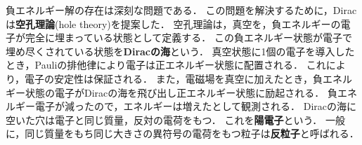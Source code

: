 \documentclass{report}
\begin{document}
    負エネルギー解の存在は深刻な問題である．
    この問題を解決するために，Diracは\textbf{空孔理論}(hole theory)を提案した．
    空孔理論は，真空を，負エネルギーの電子が完全に埋まっている状態として定義する．
    この負エネルギー状態が電子で埋め尽くされている状態を\textbf{Diracの海}という．
    真空状態に1個の電子を導入したとき，Pauliの排他律により電子は正エネルギー状態に配置される．
    これにより，電子の安定性は保証される．
    また，電磁場を真空に加えたとき，負エネルギー状態の電子がDiracの海を飛び出し正エネルギー状態に励起される．
    負エネルギー電子が減ったので，エネルギーは増えたとして観測される．
    Diracの海に空いた穴は電子と同じ質量，反対の電荷をもつ．
    これを\textbf{陽電子}という．
    一般に，同じ質量をもち同じ大きさの異符号の電荷をもつ粒子は\textbf{反粒子}と呼ばれる．
\end{document}
